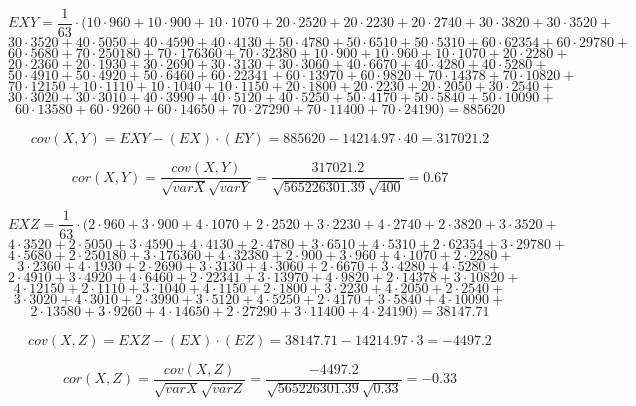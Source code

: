 \documentclass[11pt,twoside,a4paper]{book}
\begin{document}
$$EXY= \frac{1}{63}\cdot(10\cdot 960  + 10\cdot  900  + 10\cdot  1070 +
20 \cdot  2520+ 20 \cdot   2230+ 20 \cdot  2740  +30 \cdot   3820 +30\cdot  
 3520+$$ $$30 \cdot  3520 +40\cdot 
5050 +40\cdot  4590 +40\cdot 4130 +50\cdot  4780
+50\cdot   6510 +50\cdot 5310+60\cdot  62354
 +60\cdot  29780 +$$ $$60\cdot   5680  +70\cdot  250180
+70\cdot   176360 +70\cdot 32380 +10\cdot 900
 +10\cdot 960 +10\cdot  1070 + 20 \cdot 2280+$$
 $$20\cdot   2360  +20\cdot  1930
+30\cdot   2690 +30\cdot  3130 +30\cdot 3060
 +40\cdot 6670 +40\cdot  4280 + 40 \cdot  5280+$$
 $$50\cdot  4910  +50\cdot 4920
+50\cdot 6460 +60\cdot  22341 +60\cdot 13970
 +60\cdot  9820 +70\cdot  14378 + 70 \cdot  10820+$$
 $$70\cdot  12150  +10\cdot 1110
+10\cdot  1040 +10\cdot  1150 +20\cdot 1800
 +20\cdot 2230 +20\cdot   2050 + 30 \cdot  2540+$$
 $$30\cdot   3020  +30\cdot  3010
+40\cdot  3990 +40\cdot   5120 +40\cdot  5250
 +50\cdot 4170 +50\cdot   5840 + 50 \cdot  10090+$$
$$60\cdot  13580  +60\cdot  9260
+60\cdot 14650  +70\cdot 27290 +70\cdot  11400
 +70\cdot   24190)=885620$$

$$cov\left(X,Y\right)=EXY-\left(EX\right)\cdot \left(EY\right)=885620
-14214.97\cdot 40= 317021.2$$

$$cor(X,Y)=\frac{cov(X,Y)}{\sqrt{varX}\sqrt{varY}}=\frac{317021.2}{\sqrt{565226301.39}\sqrt{400}}=0.67$$

$$EXZ= \frac{1}{63}\cdot(2\cdot 960  + 3\cdot  900  + 4\cdot  1070 +
2 \cdot  2520+ 3 \cdot   2230+ 4 \cdot  2740  +2 \cdot   3820 +3\cdot  
 3520+$$ $$4 \cdot  3520 +2\cdot 
5050 +3\cdot  4590 +4\cdot 4130 +2\cdot  4780
+3\cdot   6510 +4\cdot 5310+2\cdot  62354
 +3\cdot  29780 +$$ $$4\cdot   5680  +2\cdot  250180
+3\cdot   176360 +4\cdot 32380 +2\cdot 900
 +3\cdot 960 +4\cdot  1070 + 2 \cdot 2280+$$
 $$3\cdot   2360  +4\cdot  1930
+2\cdot   2690 +3\cdot  3130 +4\cdot 3060
 +2\cdot 6670 +3\cdot  4280 + 4 \cdot  5280+$$
 $$2\cdot  4910  +3\cdot 4920
+4\cdot 6460 +2\cdot  22341 +3\cdot 13970
 +4\cdot  9820 +2\cdot  14378 + 3 \cdot  10820+$$
 $$4\cdot  12150  +2\cdot 1110
+3\cdot  1040 +4\cdot  1150 +2\cdot 1800
 +3\cdot 2230 +4\cdot   2050 + 2 \cdot  2540+$$
 $$3\cdot   3020  +4\cdot  3010
+2\cdot  3990 +3\cdot   5120 +4\cdot  5250
 +2\cdot 4170 +3\cdot   5840 + 4 \cdot  10090+$$
$$2\cdot  13580  +3\cdot  9260
+4\cdot 14650  +2\cdot 27290 +3\cdot  11400
 +4\cdot   24190)=38147.71$$

$$cov\left(X,Z\right)=EXZ-\left(EX\right)\cdot \left(EZ\right)=38147.71
-14214.97\cdot 3=-4497.2$$

$$cor(X,Z)=\frac{cov(X,Z)}{\sqrt{varX}\sqrt{varZ}}=\frac{-4497.2}{\sqrt{565226301.39}\sqrt{0.33}}=-0.33$$
\end{document}
